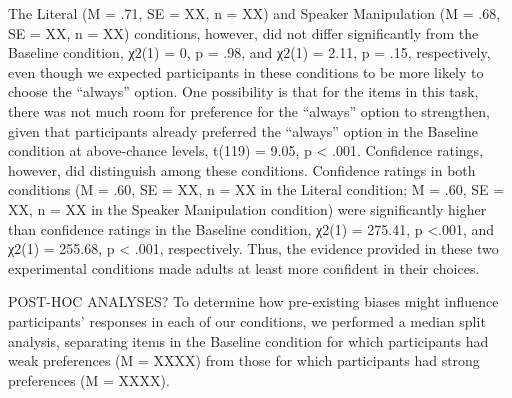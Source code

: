 \documentclass[10pt,letterpaper]{article}
\begin{document}
The Literal (M = .71, SE = XX, n = XX) and Speaker Manipulation (M = .68,  SE = XX, n = XX) conditions, however, did not differ significantly from the Baseline condition, χ2(1) = 0, p = .98, and χ2(1) = 2.11, p = .15, respectively, even though we expected participants in these conditions to be more likely to choose the “always” option.  One possibility is that for the items in this task, there was not much room for preference for the “always” option to strengthen, given that participants already preferred the “always” option in the Baseline condition at above-chance levels, t(119) = 9.05, p < .001.  Confidence ratings, however, did distinguish among these conditions.  Confidence ratings in both conditions (M = .60, SE = XX, n = XX in the Literal condition; M = .60, SE = XX, n = XX in the Speaker Manipulation condition) were significantly higher than confidence ratings in the Baseline condition,  χ2(1) = 275.41, p <.001, and χ2(1) = 255.68, p < .001, respectively.  Thus, the evidence provided in these two experimental conditions made adults at least more confident in their choices.  

POST-HOC ANALYSES?
To determine how pre-existing biases might influence participants’ responses in each of our conditions, we performed a median split analysis, separating items in the Baseline condition for which participants had weak preferences (M  = XXXX) from those for which participants had strong preferences (M = XXXX).  




\setlength{\bibleftmargin}{.125in}
\setlength{\bibindent}{-\bibleftmargin}


\end{document}
